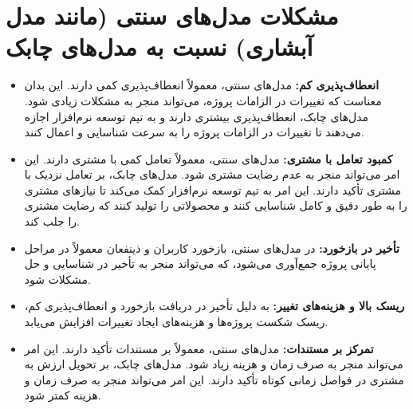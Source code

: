 \section*{ مشکلات مدل‌های سنتی (مانند مدل آبشاری) نسبت به مدل‌های چابک}
\begin{itemize}
	\item \textbf{انعطاف‌پذیری کم:}
	مدل‌های سنتی، معمولاً انعطاف‌پذیری کمی دارند. این بدان معناست که تغییرات در الزامات پروژه، می‌تواند منجر به مشکلات زیادی شود. مدل‌های چابک، انعطاف‌پذیری بیشتری دارند و به تیم توسعه نرم‌افزار اجازه می‌دهند تا تغییرات در الزامات پروژه را به سرعت شناسایی و اعمال کنند.
	
	\item \textbf{کمبود تعامل با مشتری:}
	مدل‌های سنتی، معمولاً تعامل کمی با مشتری دارند. این امر می‌تواند منجر به عدم رضایت مشتری شود. مدل‌های چابک، بر تعامل نزدیک با مشتری تأکید دارند. این امر به تیم توسعه نرم‌افزار کمک می‌کند تا نیازهای مشتری را به طور دقیق و کامل شناسایی کنند و محصولاتی را تولید کنند که رضایت مشتری را جلب کند.
	
	\item \textbf{تأخیر در بازخورد:}
	در مدل‌های سنتی، بازخورد کاربران و ذینفعان معمولاً در مراحل پایانی پروژه جمع‌آوری می‌شود، که می‌تواند منجر به تأخیر در شناسایی و حل مشکلات شود.
	
	\item \textbf{ریسک بالا و هزینه‌های تغییر:}
	به دلیل تأخیر در دریافت بازخورد و انعطاف‌پذیری کم، ریسک شکست پروژه‌ها و هزینه‌های ایجاد تغییرات افزایش می‌یابد.
	
	\item \textbf{تمرکز بر مستندات:}
	مدل‌های سنتی، معمولاً بر مستندات تأکید دارند. این امر می‌تواند منجر به صرف زمان و هزینه زیاد شود. مدل‌های چابک، بر تحویل ارزش به مشتری در فواصل زمانی کوتاه تأکید دارند. این امر می‌تواند منجر به صرف زمان و هزینه کمتر شود.
	
\end{itemize}